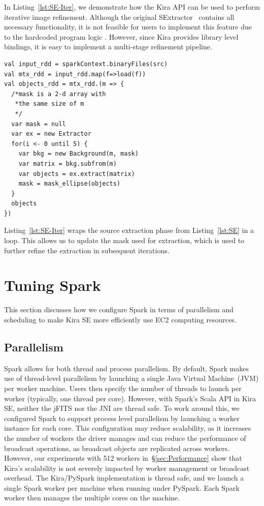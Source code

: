 \documentclass[10pt,journal,compsoc]{IEEEtran}
\begin{document}
In Listing~\ref{lst:SE-Iter}, we demonstrate how the Kira API can be used to perform
iterative image refinement. Although the original SExtractor~\cite{bertin96} contains all necessary functionality, 
it is not feasible for users to implement this feature due to the hardcoded program logic . However, since Kira provides
library level bindings, it is easy to implement a multi-stage refinement pipeline.

\begin{lstlisting}[caption=Iterative Objects Extraction Logic, label=lst:SE-Iter, linewidth=0.5\textwidth, xleftmargin=2.5ex]
val input_rdd = sparkContext.binaryFiles(src)
val mtx_rdd = input_rdd.map(f=>load(f))
val objects_rdd = mtx_rdd.(m => {
  /*mask is a 2-d array with 
   *the same size of m
   */
  var mask = null
  var ex = new Extractor   
  for(i <- 0 until 5) {
    var bkg = new Background(m, mask)
    var matrix = bkg.subfrom(m) 
    var objects = ex.extract(matrix)
    mask = mask_ellipse(objects)  
  }
  objects
})
\end{lstlisting}

Listing~\ref{lst:SE-Iter} wraps the source extraction phase from Listing~\ref{lst:SE} in a loop. 
This allows us to update the mask used for extraction, which is used to further refine the extraction
in subsequent iterations.

\section{Tuning Spark}
This section discusses how we configure Spark in terms of parallelism and scheduling to make
Kira SE more efficiently use EC2 computing resources. 

\subsection{Parallelism}

Spark allows for both thread and process parallelism. By default, Spark makes use of
thread-level parallelism by launching a single Java Virtual Machine~(JVM) per worker machine.
Users then specify the number of threads to launch per worker (typically, one thread per core).
However, with Spark's Scala API in Kira SE, neither the jFITS nor the JNI are thread safe. 
To work around this, we configured Spark to support process level parallelism by launching 
a worker instance for each core. 
This configuration may reduce scalability, as it increases the number of workers the driver manages
and can reduce the performance of broadcast operations, as broadcast objects are replicated across workers.
However, our experiments with 512 workers in~\S\ref{sec:Performance} show that Kira's scalability is 
not severely impacted by worker management or broadcast overhead.
The Kira/PySpark implementation is thread safe, and we launch a single Spark worker per machine when running
under PySpark. Each Spark worker then manages the multiple cores on the machine.
\end{document}
